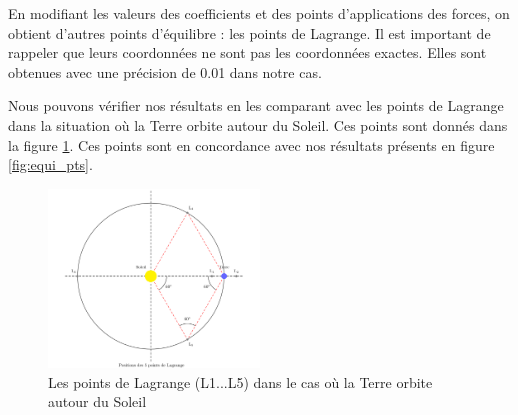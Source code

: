En modifiant les valeurs des coefficients et des points d'applications des forces, on obtient d'autres points d'équilibre : les points de Lagrange. Il est important de rappeler que leurs coordonnées ne sont pas les coordonnées exactes. Elles sont obtenues avec une précision de 0.01 dans notre cas.

\bigskip

Nous pouvons vérifier nos résultats en les comparant avec les points de Lagrange dans la situation où la Terre orbite autour du Soleil. Ces points sont donnés dans la figure \ref{fig:lagr_pts}. Ces points sont en concordance avec nos résultats présents en figure \ref{fig:equi_pts}.

\begin{figure}[ht]
  \centering
  \includegraphics[width=0.5\textwidth]{img/lagrangian_points.png}
  \caption{Les points de Lagrange (L1...L5) dans le cas où la Terre orbite autour du Soleil}
  \label{fig:lagr_pts}
\end{figure}
